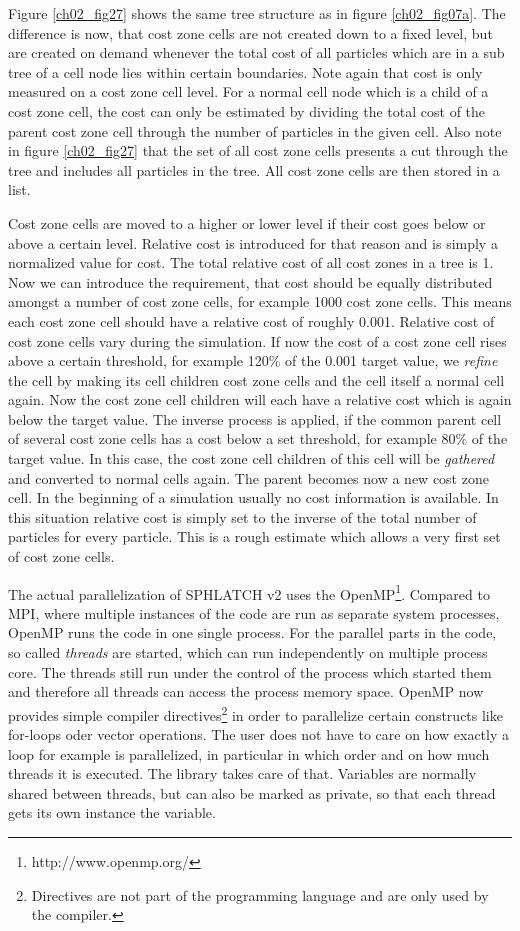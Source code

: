 Figure \ref{ch02_fig27} shows the same tree structure as in figure \ref{ch02_fig07a}. The difference is now, that cost zone cells are not created down to a fixed level, but are created on demand whenever the total cost of all particles which are in a sub tree of a cell node lies within certain boundaries. Note again that cost is only measured on a cost zone cell level. For a normal cell node which is a child of a cost zone cell, the cost can only be estimated by dividing the total cost of the parent cost zone cell through the number of particles in the given cell. Also note in figure \ref{ch02_fig27} that the set of all cost zone cells presents a cut through the tree and includes all particles in the tree. All cost zone cells are then stored in a list.

Cost zone cells are moved to a higher or lower level if their cost goes below or above a certain level. Relative cost is introduced for that reason and is simply a normalized value for cost. The total relative cost of all cost zones in a tree is 1. Now we can introduce the requirement, that cost should be equally distributed amongst a number of cost zone cells, for example 1000 cost zone cells. This means each cost zone cell should have a relative cost of roughly 0.001. Relative cost of cost zone cells vary during the simulation. If now the cost of a cost zone cell rises above a certain threshold, for example 120\% of the 0.001 target value, we \emph{refine} the cell by making its cell children cost zone cells and the cell itself a normal cell again. Now the cost zone cell children will each have a relative cost which is again below the target value. The inverse process is applied, if the common parent cell of several cost zone cells has a cost below a set threshold, for example 80\% of the target value. In this case, the cost zone cell children of this cell will be \emph{gathered} and converted to normal cells again. The parent becomes now a new cost zone cell. In the beginning of a simulation usually no cost information is available. In this situation relative cost is simply set to the inverse of the total number of particles for every particle. This is a rough estimate which allows a very first set of cost zone cells. 

The actual parallelization of SPHLATCH v2 uses the OpenMP\footnote{http://www.openmp.org/}. Compared to MPI, where multiple instances of the code are run as separate system processes, OpenMP runs the code in one single process. For the parallel parts in the code, so called \emph{threads} are started, which can  run independently on multiple process core. The threads still run under the control of the process which started them and therefore all threads can access the process memory space. OpenMP now provides simple compiler directives\footnote{Directives are not part of the programming language  and are only used by the compiler.} in order to parallelize certain constructs like for-loops oder vector operations. The user does not have to care on how exactly a loop for example is parallelized, in particular in which order and on how much threads it is executed. The library takes care of that. Variables are normally shared between threads, but can also be marked as private, so that each thread gets its own instance the variable. 

